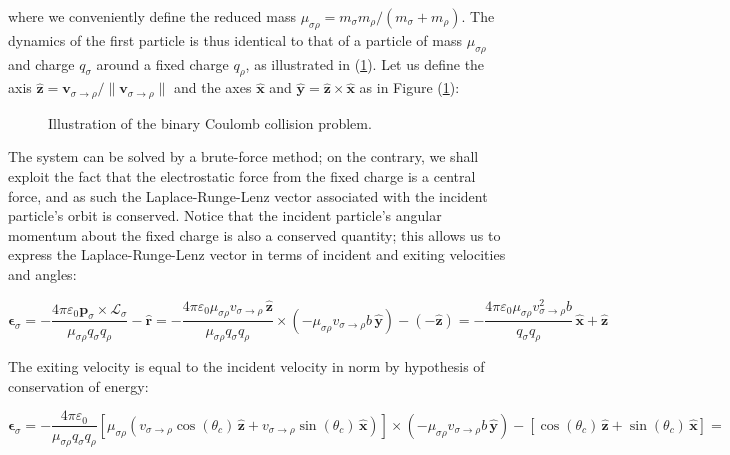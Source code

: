 where we conveniently define the reduced mass $\mu_{\sigma\rho}=m_\sigma m_\rho/\left(m_\sigma+m_\rho\right)$. The dynamics of the first particle is thus identical to that of a particle of mass $\mu_{\sigma\rho}$ and charge $q_\sigma$ around a fixed charge $q_\rho$, as illustrated in (\ref{fig1-3}). Let us define the axis $\mathbf{\hat{z}}=\mathbf{v}_{\sigma\to\rho}/\|\mathbf{v}_{\sigma\to\rho}\|$ and the axes $\mathbf{\hat{x}}$ and $\mathbf{\hat{y}}=\mathbf{\hat{z}}\times\mathbf{\hat{x}}$ as in Figure (\ref{fig1-3}): 

\begin{figure}[H]
    \centering
    
    \caption{Illustration of the binary Coulomb collision problem.}
    \label{fig1-3}
\end{figure}

The system can be solved by a brute-force method; on the contrary, we shall exploit the fact that the electrostatic force from the fixed charge is a central force, and as such the Laplace-Runge-Lenz vector associated with the incident particle's orbit is conserved. Notice that the incident particle's angular momentum about the fixed charge is also a conserved quantity; this allows us to express the Laplace-Runge-Lenz vector in terms of incident and exiting velocities and angles:

\begin{equation}
    \label{eq-1-29}
    \boldsymbol{\epsilon}_\sigma=-\frac{4\pi\varepsilon_0\mathbf{p}_\sigma\times\mathbf{\mathcal{L}}_\sigma}{\mu_{\sigma\rho}q_\sigma q_\rho}-\mathbf{\hat{r}}=
    -\frac{4\pi\varepsilon_0\mu_{\sigma\rho}v_{\sigma\to\rho}\,\mathbf{\hat{z}}}{\mu_{\sigma\rho}q_\sigma q_\rho}\times\left(-\mu_{\sigma\rho}v_{\sigma\to\rho} b\,\mathbf{\hat{y}}\right)-\left(-\mathbf{\hat{z}}\right)=-\frac{4\pi\varepsilon_0\mu_{\sigma\rho}v_{\sigma\to\rho}^2b}{q_\sigma q_\rho}\,\mathbf{\hat{x}}+\mathbf{\hat{z}}
\end{equation}

The exiting velocity is equal to the incident velocity in norm by hypothesis of conservation of energy:

\begin{equation*}
    \boldsymbol{\epsilon}_\sigma=-\frac{4\pi\varepsilon_0}{\mu_{\sigma\rho}q_\sigma q_\rho}\left[\mu_{\sigma\rho}\left(v_{\sigma\to\rho}\cos(\theta_c)\,\mathbf{\hat{z}}+v_{\sigma\to\rho}\sin(\theta_c)\,\mathbf{\hat{x}}\right)\right]\times\left(-\mu_{\sigma\rho}v_{\sigma\to\rho} b\,\mathbf{\hat{y}}\right)-\left[\cos(\theta_c)\,\mathbf{\hat{z}}+\sin(\theta_c)\,\mathbf{\hat{x}}\right]=
\end{equation*}

